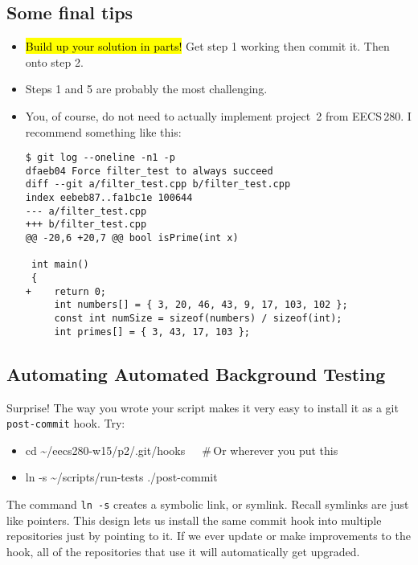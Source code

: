 \documentclass{article}
\begin{document}
\medskip
\noindent

\newpage

\subsection*{Some final tips}

\begin{itemize}
    \item \hl{Build up your solution in parts!} Get step 1 working then commit it.
    Then onto step 2.
  \item Steps 1 and 5 are probably the most challenging.
  \item You, of course, do not need to actually implement project~2 from
    EECS\,280.  I recommend something like this:%
\lstset{basicstyle=\footnotesize\ttfamily}
\begin{lstlisting}
$ git log --oneline -n1 -p
dfaeb04 Force filter_test to always succeed
diff --git a/filter_test.cpp b/filter_test.cpp
index eebeb87..fa1bc1e 100644
--- a/filter_test.cpp
+++ b/filter_test.cpp
@@ -20,6 +20,7 @@ bool isPrime(int x)
 
 int main()
 {
+    return 0;
     int numbers[] = { 3, 20, 46, 43, 9, 17, 103, 102 };
     const int numSize = sizeof(numbers) / sizeof(int);
     int primes[] = { 3, 43, 17, 103 };
\end{lstlisting}
\end{itemize}

\subsection*{Automating Automated Background Testing}
Surprise! The way you wrote your script makes it very easy to install it as a git
\texttt{post-commit} hook. Try:

\begin{itemize}\tt
    \item cd \textasciitilde/eecs280-w15/p2/.git/hooks~~~\#\,Or wherever you put this
    \item ln -s \textasciitilde/scripts/run-tests ./post-commit
\end{itemize}

\noindent
The command \texttt{ln -s} creates a symbolic link, or symlink. Recall
symlinks are just like pointers. This design lets us install the same commit
hook into multiple repositories just by pointing to it. If we ever update or
make improvements to the hook, all of the repositories that use it will
automatically get upgraded.
\end{document}
